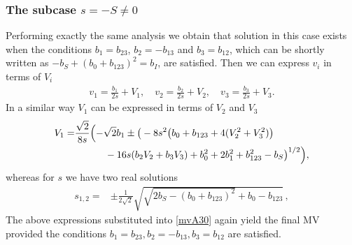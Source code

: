 \documentclass{birkjour}
\begin{document}
\subsubsection{The subcase $s=-S\neq 0$}
Performing exactly the same analysis we obtain that solution in
this case exists when the conditions $b_1 = b_{23}$, $b_2 =
-b_{13}$ and $b_3= b_{12}$, which can be shortly written as
$-b_S+(b_0+b_{123})^2=b_I$, are satisfied. Then we can express
$v_i$ in terms of $V_i$
\begin{equation}\begin{split}\label{vVSpecial2Cl03}
v_{1}= \frac{b_{1}}{2 s}+V_{1},\quad v_{2}= \frac{b_{2}}{2 s}+V_{2},\quad v_{3}= \frac{b_{3}}{2 s}+V_{3}.
\end{split}\end{equation}
In a similar way $V_1$ can  be expressed in terms of $V_2$ and
$V_3$
\begin{equation}\begin{split}\label{Aspec2Cl03}
  V_{1}=& \frac{\sqrt{2}}{8 s}\Bigl(-\sqrt{2} b_{1}\pm \big(-8 s^2 \big(b_{0}+b_{123}+4(V_{2}^2+V_{3}^2)\big)\\
  &\phantom{\big(-8 s^2 }
  -16 s (b_{2} V_{2}+b_{3} V_{3})+b_{0}^2+2 b_{1}^2+b_{123}^2-b_{S}\big)^{1/2}\Bigr),
\end{split}\end{equation}
whereas for $s$ we have two real solutions
\begin{equation}\begin{split}\label{solSspec1NegCl03}
s_{1,2} =& \pm\tfrac{1}{2 \sqrt{2}}\sqrt{\sqrt{2
b_{S}-(b_{0}+b_{123})^2}+b_{0}-b_{123}}\,,
\end{split}\end{equation}
The above expressions substituted into \eqref{mvA30} again yield
the final MV provided the conditions $b_1 = b_{23},  b_2 =
-b_{13}, b_3= b_{12}$ are satisfied.
\end{document}

